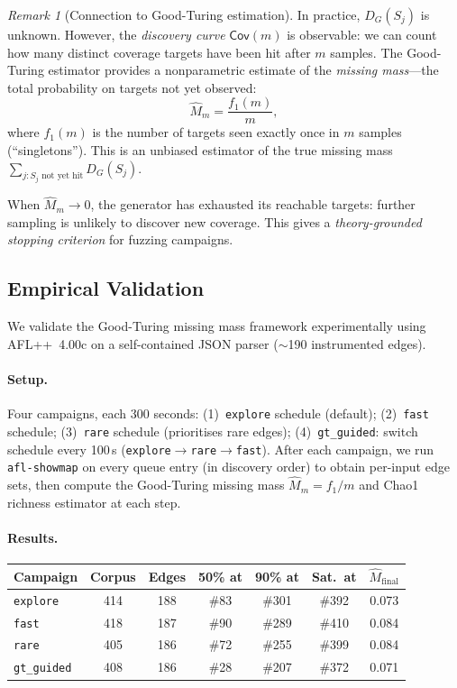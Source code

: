 \documentclass[11pt]{article}
\theoremstyle{remark}
\newtheorem{remark}[definition]{Remark}
\theoremstyle{definition}
\begin{document}
\begin{remark}[Connection to Good-Turing estimation]\label{rem:good-turing}
In practice, $D_G(S_j)$ is unknown.  However, the \emph{discovery curve}
$\mathsf{Cov}(m)$ is observable: we can count how many distinct coverage
targets have been hit after $m$ samples.  The Good-Turing estimator
provides a nonparametric estimate of the \emph{missing mass}---the total
probability on targets not yet observed:
\[
  \widehat{M}_m = \frac{f_1(m)}{m},
\]
where $f_1(m)$ is the number of targets seen exactly once in $m$ samples
(``singletons'').  This is an unbiased estimator of the true missing mass
$\sum_{j : S_j \text{ not yet hit}} D_G(S_j)$.

When $\widehat{M}_m \to 0$, the generator has exhausted its reachable
targets: further sampling is unlikely to discover new coverage.
This gives a \emph{theory-grounded stopping criterion} for fuzzing
campaigns.
\end{remark}

\subsection{Empirical Validation}\label{sec:empirical}

We validate the Good-Turing missing mass framework experimentally using
AFL++~4.00c on a self-contained JSON parser ($\sim$190 instrumented edges).

\paragraph{Setup.}
Four campaigns, each 300 seconds:
(1)~\texttt{explore} schedule (default);
(2)~\texttt{fast} schedule;
(3)~\texttt{rare} schedule (prioritises rare edges);
(4)~\texttt{gt\_guided}: switch schedule every 100\,s
(\texttt{explore}$\to$\texttt{rare}$\to$\texttt{fast}).
After each campaign, we run \texttt{afl-showmap} on every queue entry
(in discovery order) to obtain per-input edge sets, then compute the
Good-Turing missing mass $\widehat{M}_m = f_1/m$ and Chao1 richness
estimator at each step.

\paragraph{Results.}
\begin{center}
\begin{tabular}{lcccccc}
\hline
Campaign & Corpus & Edges & 50\% at & 90\% at & Sat.\ at & $\widehat{M}_{\mathrm{final}}$ \\
\hline
\texttt{explore}    & 414 & 188 & \#83  & \#301 & \#392 & 0.073 \\
\texttt{fast}       & 418 & 187 & \#90  & \#289 & \#410 & 0.084 \\
\texttt{rare}       & 405 & 186 & \#72  & \#255 & \#399 & 0.084 \\
\texttt{gt\_guided} & 408 & 186 & \#28  & \#207 & \#372 & 0.071 \\
\hline
\end{tabular}
\end{center}
\end{document}
